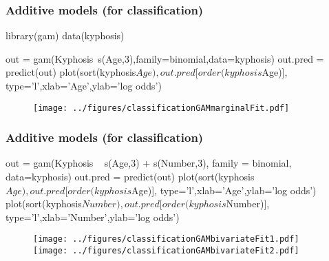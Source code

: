 \documentclass[12pt]{beamer}
\begin{document}
\begin{frame}[fragile]
\frametitle{Additive models (for classification)}
\begin{blockcode}
library(gam)
data(kyphosis)

out = gam(Kyphosis~s(Age,3),family=binomial,data=kyphosis)
out.pred = predict(out)
plot(sort(kyphosis$Age),out.pred[order(kyphosis$Age)],
       type='l',xlab='Age',ylab='log odds')
\end{blockcode}
\begin{figure}
\centering
\texttt{[image: ../figures/classificationGAMmarginalFit.pdf]}
\end{figure}
\end{frame}


\begin{frame}[fragile]
\frametitle{Additive models (for classification)}
\begin{blockcode}
out = gam(Kyphosis ~ s(Age,3) + s(Number,3),
        family = binomial, data=kyphosis)
out.pred = predict(out)
plot(sort(kyphosis$Age),out.pred[order(kyphosis$Age)],
     type='l',xlab='Age',ylab='log odds')
plot(sort(kyphosis$Number),out.pred[order(kyphosis$Number)],
     type='l',xlab='Number',ylab='log odds')
\end{blockcode}
\begin{figure}
\centering
\texttt{[image: ../figures/classificationGAMbivariateFit1.pdf]}
\texttt{[image: ../figures/classificationGAMbivariateFit2.pdf]}
\end{figure}
\end{frame}
%
%
%
%
\end{document}
